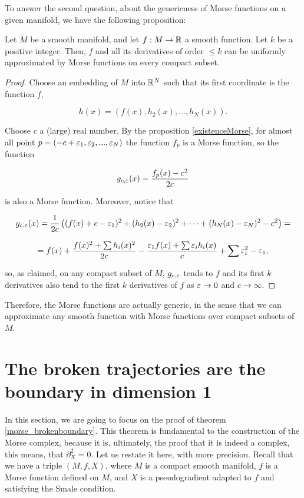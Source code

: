 To answer the second question, about the genericness of Morse functions on a given manifold, we have the following proposition:

\begin{prop} \label{proposition:morse_generic}
Let $M$ be a smooth manifold, and let $f : M \rightarrow \mathbb{R}$ a smooth function. Let $k$ be a positive integer. Then, $f$ and all its derivatives of order $\leq k$ can be uniformly approximated by Morse functions on every compact subset.
\end{prop}

\begin{proof}
Choose an embedding of $M$ into $\mathbb{R}^N$ such that its first coordinate is the function $f$,

\begin{displaymath}
h(x) = (f(x),h_2(x),...,h_N(x)) .
\end{displaymath}

Choose $c$ a (large) real number. By the proposition \ref{existenceMorse}, for almost all point $p = (-c+\varepsilon_1,\varepsilon_2,...,\varepsilon_N)$ the function $f_p$ is a Morse function, so the function

$$g_{c,\varepsilon}(x) = \frac{f_p(x)-c^2}{2c}$$

is also a Morse function. Moreover, notice that

$$g_{c,\varepsilon}(x) = \frac1{2c} \left((f(x) + c - \varepsilon_1)^2 + (h_2(x)-\varepsilon_2)^2 + \cdots + (h_N(x)-\varepsilon_N)^2 - c^2 \right) =$$

$$= f(x) + \frac{f(x)^2 + \sum h_i(x)^2}{2c} - \frac{\varepsilon_1f(x) + \sum \varepsilon_ih_i(x)}{c} + \sum \varepsilon_i^2 - \varepsilon_1 ,$$

so, as claimed, on any compact subset of $M$, $g_{c,\varepsilon}$ tends to $f$ and its first $k$ derivatives also tend to the first $k$ derivatives of $f$ as $\varepsilon \rightarrow 0$ and $c \rightarrow \infty$.
\end{proof}

Therefore, the Morse functions are actually generic, in the sense that we can approximate any smooth function with Morse functions over compact subsets of $M$.

\section{The broken trajectories are the boundary in dimension 1} \label{appendix:brokenboundary}

In this section, we are going to focus on the proof of theorem \ref{morse_brokenboundary}. This theorem is fundamental to the construction of the Morse complex, because it is, ultimately, the proof that it is indeed a complex, this means, that $\partial_X^2 = 0$. Let us restate it here, with more precision. Recall that we have a triple $(M, f, X)$, where $M$ is a compact smooth manifold, $f$ is a Morse function defined on $M$, and $X$ is a pseudogradient adapted to $f$ and satisfying the Smale condition.

